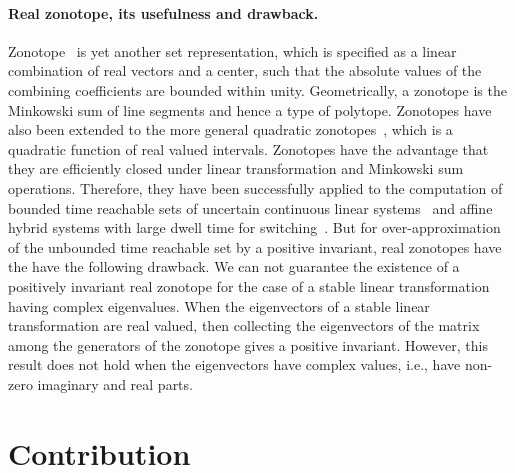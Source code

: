 \documentclass[11pt,a4paper,twoside,openright]{article}
\begin{document}
\paragraph{Real zonotope, its usefulness and drawback.}
Zonotope~\cite{DBLP:conf/hybrid/Girard05} is yet another set
representation, which is specified as a linear combination of real
vectors and a center, such that the absolute values of the combining
coefficients are bounded within unity.  Geometrically, a zonotope is
the Minkowski sum of line segments and hence a type of polytope.
Zonotopes have also been extended to the more general quadratic
zonotopes~\cite{DBLP:conf/aplas/AdjeGW15}, which is a quadratic
function of real valued intervals.  Zonotopes have the advantage that
they are efficiently closed under linear transformation and Minkowski
sum operations.  Therefore, they have been successfully applied to the
computation of bounded time reachable sets of uncertain continuous
linear systems~\cite{todo} and affine hybrid systems with large dwell
time for switching~\cite{todo}.  But for over-approximation of the
unbounded time reachable set by a positive invariant, real zonotopes
have the have the following drawback.  We can not guarantee the
existence of a positively invariant real zonotope for the case of a
stable linear transformation having complex eigenvalues.  When the
eigenvectors of a stable linear transformation are real valued, then
collecting the eigenvectors of the matrix among the generators of the
zonotope gives a positive invariant.  However, this result does not
hold when the eigenvectors have complex values, i.e., have non-zero
imaginary and real parts.



\section {Contribution}
\end{document}

